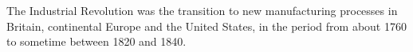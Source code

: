 \documentclass{article}
\begin{document}
	The Industrial Revolution was the transition to new manufacturing processes in Britain, continental Europe and the United States, in the period from about 1760 to sometime between 1820 and 1840.\cite{moru2020machine}
	\newpage
	
	
\end{document}
